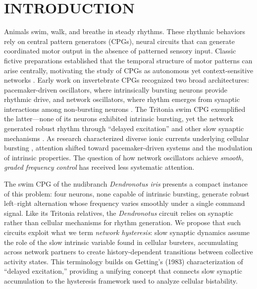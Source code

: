 \section*{INTRODUCTION}

Animals swim, walk, and breathe in steady rhythms.
These rhythmic behaviors rely on central pattern generators (CPGs), neural circuits that can generate coordinated motor output in the absence of patterned sensory input.
Classic fictive preparations established that the temporal structure of motor patterns can arise centrally, motivating the study of CPGs as autonomous yet context-sensitive networks \cite{Wilson1961, MarderCalabrese1996, Kiehn2006}.
Early work on invertebrate CPGs recognized two broad architectures: pacemaker-driven oscillators, where intrinsically bursting neurons provide rhythmic drive, and network oscillators, where rhythm emerges from synaptic interactions among non-bursting neurons \cite{Getting1989}.
The Tritonia swim CPG exemplified the latter---none of its neurons exhibited intrinsic bursting, yet the network generated robust rhythm through ``delayed excitation'' and other slow synaptic mechanisms \cite{Getting1983delayed, Getting1983network}.
As research characterized diverse ionic currents underlying cellular bursting \cite{Rinzel87b, RL87}, attention shifted toward pacemaker-driven systems and the modulation of intrinsic properties.
The question of how network oscillators achieve \textit{smooth, graded frequency control} has received less systematic attention.

The swim CPG of the nudibranch \textit{Dendronotus iris} presents a compact instance of this problem: four neurons, none capable of intrinsic bursting, generate robust left--right alternation whose frequency varies smoothly under a single command signal.
Like its Tritonia relatives, the \textit{Dendronotus} circuit relies on synaptic rather than cellular mechanisms for rhythm generation.
We propose that such circuits exploit what we term \textit{network hysteresis}: slow synaptic dynamics assume the role of the slow intrinsic variable found in cellular bursters, accumulating across network partners to create history-dependent transitions between collective activity states.
This terminology builds on Getting's (1983) characterization of ``delayed excitation,'' providing a unifying concept that connects slow synaptic accumulation to the hysteresis framework used to analyze cellular bistability.

